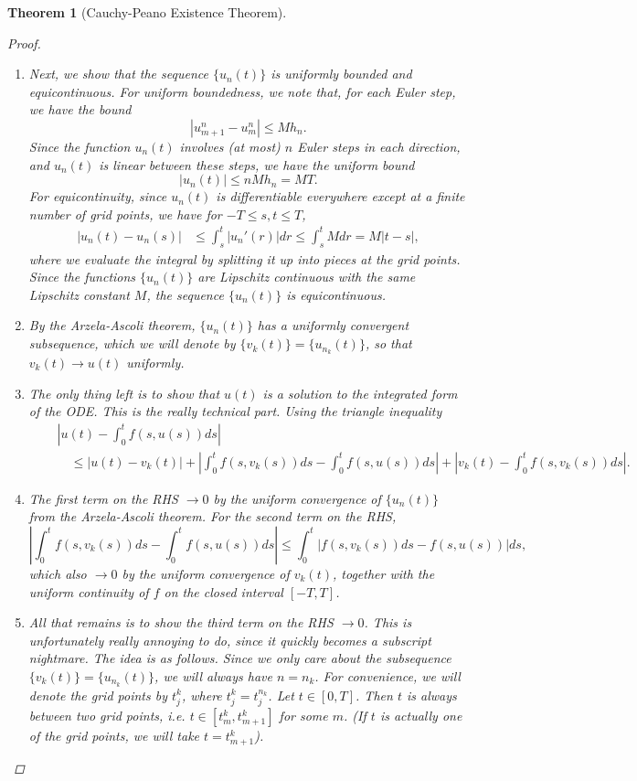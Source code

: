 \documentclass[12pt]{amsart}         %
\newtheorem{theorem}{Theorem}[section]
\theoremstyle{remark}
\begin{document}
\begin{theorem}[Cauchy-Peano Existence Theorem]
\begin{proof}
\begin{enumerate}
    \item Next, we show that the sequence $\{ u_n(t) \}$ is uniformly bounded and equicontinuous. For uniform boundedness, we note that, for each Euler step, we have the bound
    \[
    |u_{m+1}^n - u_m^n| \leq M h_n.
    \]
    Since the function $u_n(t)$ involves (at most) $n$ Euler steps in each direction, and $u_n(t)$ is linear between these steps, we have the uniform bound
    \[
    |u_n(t)| \leq n M h_n = M T.
    \]
    For equicontinuity, since $u_n(t)$ is differentiable everywhere except at a finite number of grid points, we have for $-T \leq s,t \leq T$,
    \begin{align*}
        |u_n(t) - u_n(s)| &\leq \int_s^t |u_n'(r)| dr
        \leq \int_s^t M dr = M|t-s|,
    \end{align*}
    where we evaluate the integral by splitting it up into pieces at the grid points. Since the functions $\{u_n(t)\}$ are Lipschitz continuous with the same Lipschitz constant $M$, the sequence $\{ u_n(t) \}$ is equicontinuous.
    
    \item By the Arzela-Ascoli theorem, $\{u_n(t) \}$ has a uniformly convergent subsequence, which we will denote by $\{ v_k(t) \} = \{ u_{n_k}(t) \}$, so that $v_k(t) \rightarrow u(t)$ uniformly. 
    
    \item The only thing left is to show that $u(t)$ is a solution to the integrated form of the ODE. This is the really technical part. Using the triangle inequality
    \begin{align*}
    &\quad\left| u(t) - \int_0^t f(s, u(s))ds \right| \\
    &\qquad \leq |u(t) - v_k(t)| + \left| \int_0^t f(s, v_k(s))ds - \int_0^t f(s, u(s))ds \right| + \left| v_k(t) - \int_0^t f(s, v_k(s))ds \right|.
    \end{align*}
    \item The first term on the RHS $\rightarrow 0$ by the uniform convergence of $\{ u_n(t) \}$ from the Arzela-Ascoli theorem. For the second term on the RHS,
    \[
    \left| \int_0^t f(s, v_k(s))ds - \int_0^t f(s, u(s))ds \right|  
    \leq \int_0^t | f(s, v_k(s))ds - f(s, u(s))| ds,
    \]
    which also $\rightarrow 0$ by the uniform convergence of $v_k(t)$, together with the uniform continuity of $f$ on the closed interval $[-T, T]$.
    
    \item All that remains is to show the third term on the RHS $\rightarrow 0$. This is unfortunately really annoying to do, since it quickly becomes a subscript nightmare. The idea is as follows. Since we only care about the subsequence $\{ v_k(t) \} = \{ u_{n_k}(t) \}$, we will always have $n = n_k$. For convenience, we will denote the grid points by $t_j^k$, where $t_j^k = t_j^{n_k}$. Let $t \in [0, T]$. Then $t$ is always between two grid points, i.e. $t \in [t_m^k, t_{m+1}^k]$ for some $m$. (If $t$ is actually one of the grid points, we will take $t = t_{m+1}^k$). 
    

\end{enumerate}
\end{proof}
\end{theorem}
\end{document}
